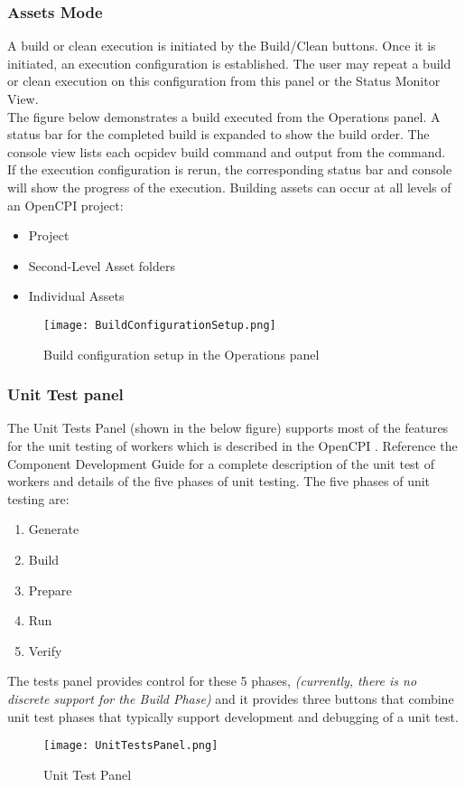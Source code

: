 \documentclass[10pt, a4paper, oneside]{article}
\begin{document}
\subsubsection{Assets Mode}
A build or clean execution is initiated by the Build/Clean buttons. Once it is initiated, an execution configuration is established. The user may repeat a build or clean execution on this configuration  from this panel or the Status Monitor View.\\

The figure below demonstrates a build executed from the Operations panel. A status bar for the completed build is expanded to show the build order. The console view lists each ocpidev build command and output from the command.\\

If the execution configuration is rerun, the corresponding status bar and console will show the progress of the execution. Building assets can occur at all levels of an OpenCPI project:
\begin{itemize}
\item Project
\item Second-Level Asset folders
\item Individual Assets
\end{itemize}

\begin{figure}[h!]
    \centering
    \caption{Build configuration setup in the Operations panel}

    \texttt{[image: BuildConfigurationSetup.png]}
     \label{fig:Operations panel}
\end{figure}
\subsubsection{Unit Test panel}
The Unit Tests Panel (shown in the below figure) supports most of the features for the unit testing of workers which is described in the OpenCPI .
Reference the Component Development Guide for a complete description of the unit test of workers and details of the five phases of unit testing. The five phases of unit testing are:
\begin{enumerate}
\item Generate
\item Build
\item Prepare
\item Run
\item Verify
\end{enumerate}
The tests panel provides control for these 5 phases, \emph{(currently, there is no discrete support for the Build Phase)} and it provides three buttons that combine unit test phases that typically support development and debugging of a unit test.
\begin{figure}[h!]
    \centering
    \caption{Unit Test Panel}
    \texttt{[image: UnitTestsPanel.png]}
      \label{fig:Unit Test panel}
\end{figure}
\end{document}

